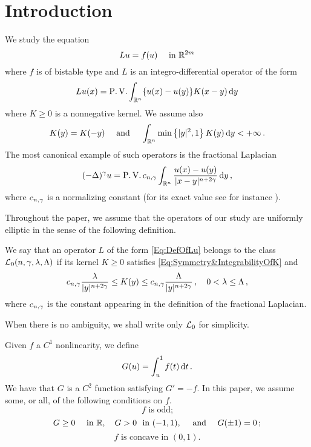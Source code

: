 \section{Introduction}
\label{Sec:Introduction}


We study the equation
\begin{equation}
\label{Eq:NonlocalAllenCahn}
Lu = f(u) \quad \textrm{ in } \mathbb{R}^{2m}
\end{equation}
where $f$ is of bistable type and $L$ is an integro-differential operator of the form
\begin{equation}
\label{Eq:DefOfLu}
Lu(x) = \operatorname{P.V.} \int_{\mathbb{R}^n} \{u(x) - u(y)\} K(x-y)\,\mathrm{d} y
\end{equation}
where $K \geq 0$ is a nonnegative kernel. We assume also
\begin{equation}
\label{Eq:Symmetry&IntegrabilityOfK}
K(y) = K(-y) \quad \textrm{ and } \quad \int_{\mathbb{R}^n} \min \left\{ |y|^2, 1 \right\} K(y) \,\mathrm{d} y < + \infty\,.
\end{equation}
The most canonical example of such operators is the fractional Laplacian
$$
(-\Delta)^\gamma u = \operatorname{P.V.} c_{n, \gamma}\int_{\mathbb{R}^n} \dfrac{u(x) - u(y)}{|x-y|^{n + 2\gamma}}\,\mathrm{d} y\,,
$$
where $c_{n, \gamma}$ is a normalizing constant (for its exact value see for instance \cite{HitchhikerGuide}).

Throughout the paper, we assume that the operators of our study are uniformly elliptic in the sense of the following definition.
\begin{definition}
\label{Def:L_0Class}
We say that an operator $L$ of the form \eqref{Eq:DefOfLu} belongs to the class $\mathcal{L}_0(n,\gamma,\lambda, \Lambda)$ if its kernel $K\geq 0$ satisfies \eqref{Eq:Symmetry&IntegrabilityOfK} and \begin{equation}
\label{Eq:Ellipticity}
c_{n,\gamma}\dfrac{\lambda}{|y|^{n+2\gamma}} \leq K(y) \leq c_{n,\gamma}\dfrac{\Lambda}{|y|^{n+2\gamma}}\,, \quad 0< \lambda \leq \Lambda \,,
\end{equation}
where $c_{n,\gamma}$ is the constant appearing in the definition of the fractional Laplacian.
\end{definition}
When there is no ambiguity, we shall write only $\mathcal{L}_0$ for simplicity.


\bigskip
[...]
\bigskip

Given $f$ a $C^1$ nonlinearity, we define
$$
G(u)= \int_u^1 f(t) \,\mathrm{d} t\,.
$$
We have that $G$ is a $C^2$ function satisfying $G' = -f$. In this paper, we assume some, or all, of the following conditions on $f$.
\begin{equation}
\label{Eq:HipothesisfOdd}
f \textrm{ is odd;}
\end{equation}
\begin{equation}
\label{Eq:HipothesisGWells}
G\geq 0 \quad \textrm{ in } \mathbb{R}, \quad G > 0 \ \textrm{ in }  (-1,1), \quad \textrm{ and }\quad G(\pm 1 )=0\,;
\end{equation}
\begin{equation}
\label{Eq:HipothesisfConcave}
f \textrm{ is concave in }  (0,1).
\end{equation}



